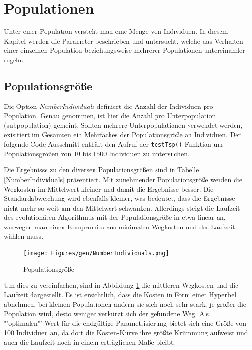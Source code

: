 \section{Populationen}\label{populations}


Unter einer Population versteht man eine Menge von Individuen. In diesem Kapitel
werden die Parameter beschrieben und untersucht, welche das Verhalten einer
einzelnen Population beziehungsweise mehrerer Populationen untereinander regeln.

\subsection{Populationsgröße}
Die Option \emph{NumberIndividuals} definiert die Anzahl der Individuen
pro Population. Genau genommen, ist hier die Anzahl pro Unterpopulation
(subpopulation) gemeint. Sollten mehrere Unterpopulationen verwendet werden,
exisitiert im Gesamten ein Mehrfaches der Populationsgröße an Individuen.
Der folgende Code-Ausschnitt enthält den Aufruf der {\tt testTsp()}-Funktion um
Populationsgrößen von 10 bis 1500 Individuen zu untersuchen.





\noindent Die Ergebnisse zu den diversen Populationsgrößen sind in Tabelle
\ref{NumberIndividuals} präsentiert. Mit zunehmender Populationsgröße werden die
Wegkosten im Mittelwert kleiner und damit die Ergebnisse besser.
Die Standardabweichung wird ebenfalls kleiner, was bedeutet, dass die Ergebnisse
nicht mehr so weit um den Mittelwert schwanken. Allerdings steigt die Laufzeit
des evolutionären Algorithmus mit der Populationsgröße in etwa linear an,
weswegen man einen Kompromiss aus minimalen Wegkosten und der Laufzeit wählen
muss.

\begin{figure}[h!]
  \centering
  \texttt{[image: Figures/gen/NumberIndividuals.png]}
  \caption{Populationsgröße}\label{fig.numberindividuals}
\end{figure}

Um dies zu vereinfachen, sind in Abbildung \ref{fig.numberindividuals} die
mittleren Wegkosten und die Laufzeit dargestellt. Es ist ersichtlich, dass die
Kosten in Form einer Hyperbel abnehmen, bei kleinen Populationen ändern sie sich
noch sehr stark, je größer die Population wird, desto weniger verkürzt sich der
gefundene Weg. Als "'optimalen"' Wert für die endgültige Parametrisierung bietet
sich eine Größe von 100 Individuen an, da dort die Kosten-Kurve ihre größte
Krümmung aufweist und auch die Laufzeit noch in einem erträglichen Maße bleibt.


